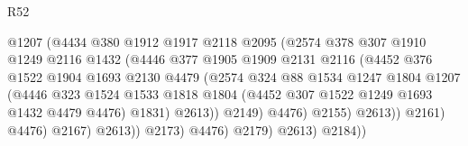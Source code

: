 \begin{lexlean}{R52}
\begin{coremodule}
                                    @1207
                                    (@4434
                                      @380
                                      @1912
                                      @1917
                                      @2118
                                      @2095
                                      (@2574
                                        @378
                                        @307
                                        @1910
                                        @1249
                                        @2116
                                        @1432
                                        (@4446
                                          @377
                                          @1905
                                          @1909
                                          @2131
                                          @2116
                                          (@4452
                                            @376
                                            @1522
                                            @1904
                                            @1693
                                            @2130
                                            @4479
                                            (@2574
                                              @324
                                              @88
                                              @1534
                                              @1247
                                              @1804
                                              @1207
                                              (@4446
                                                @323
                                                @1524
                                                @1533
                                                @1818
                                                @1804
                                                (@4452 @307 @1522 @1249 @1693 @1432 @4479 @4476)
                                                @1831)
                                              @2613))
                                          @2149)
                                        @4476)
                                      @2155)
                                    @2613))
                                @2161)
                              @4476)
                            @2167)
                          @2613))
                      @2173)
                    @4476)
                  @2179)
                @2613)
              @2184))

\end{coremodule}
\end{lexlean}

